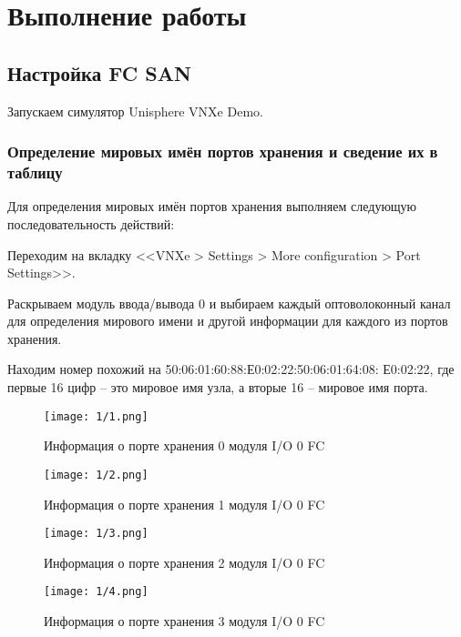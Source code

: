 \def\doing{выполняем следующую последовательность действий}

\section{Выполнение работы}

\subsection{Настройка FC SAN}

Запускаем симулятор Unisphere VNXe Demo.

\subsubsection{Определение мировых имён портов хранения и сведение их в
    таблицу}

Для определения мировых имён портов хранения \doing:

\begin{enumerate_num}
    \item Переходим на вкладку <<VNXe > Settings > More configuration > Port
    Settings>>.
    \item Раскрываем модуль ввода/вывода 0 и выбираем каждый оптоволоконный
    канал для определения мирового имени и другой информации для каждого из
    портов
    хранения.
    \item Находим номер похожий на 50:06:01:60:88:Е0:02:22:50:06:01:64:08:
    Е0:02:22, где первые 16 цифр -- это мировое имя узла, а вторые 16 --
    мировое
    имя порта.
\end{enumerate_num}

\begin{figure}[ht]
    \begin{minipage}[b]{0.5\textwidth}
        \centering\texttt{[image: 1/1.png]}
        \caption{Информация о порте хранения 0 модуля I/O 0 FC}
    \end{minipage}
    \begin{minipage}[b]{0.5\textwidth}
        \centering\texttt{[image: 1/2.png]}
        \caption{Информация о порте хранения 1 модуля I/O 0 FC}
    \end{minipage}
\end{figure}
\begin{figure}[ht]
    \begin{minipage}[b]{0.5\textwidth}
        \centering\texttt{[image: 1/3.png]}
        \caption{Информация о порте хранения 2 модуля I/O 0 FC}
    \end{minipage}
    \begin{minipage}[b]{0.5\textwidth}
        \centering\texttt{[image: 1/4.png]}
        \caption{Информация о порте хранения 3 модуля I/O 0 FC}
    \end{minipage}
\end{figure}

